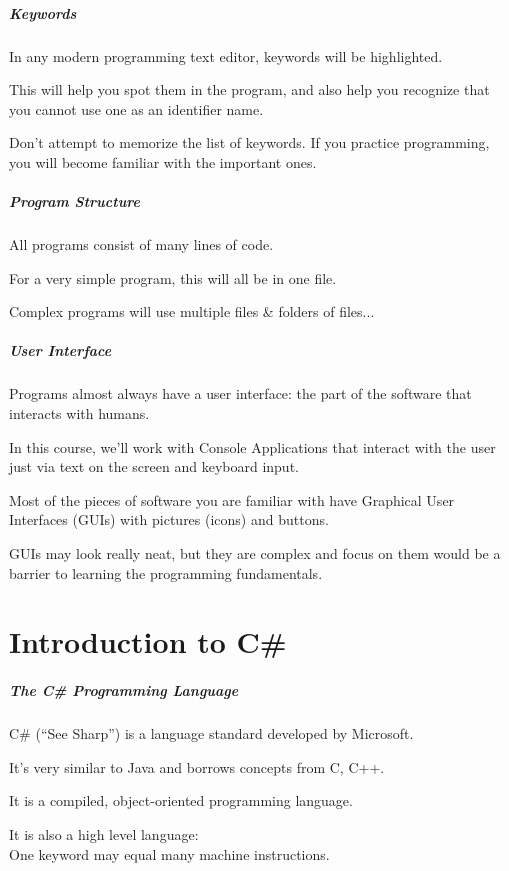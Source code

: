 \begin{frame}
\frametitle{Keywords}

In any modern programming text editor, keywords will be highlighted.

This will help you spot them in the program, and also help you recognize that you cannot use one as an identifier name.

Don't attempt to memorize the list of keywords. If you practice programming, you will become familiar with the important ones.

\end{frame}

\begin{frame}
\frametitle{Program Structure}

All programs consist of many lines of code.

For a very simple program, this will all be in one file.

Complex programs will use multiple files \& folders of files...

\end{frame}

\begin{frame}
\frametitle{User Interface}
Programs almost always have a user interface: the part of the software that interacts with humans.

In this course, we'll work with Console Applications that interact with the user just via text on the screen and keyboard input.

Most of the pieces of software you are familiar with have \alert{Graphical User Interfaces (GUIs)} with pictures (icons) and buttons.

GUIs may look really neat, but they are complex and focus on them would be a barrier to learning the programming fundamentals.

\end{frame}


\part{Introduction to C\#}
\begin{frame}\partpage\end{frame}

\begin{frame}
\frametitle{The C\# Programming Language}
\alert{C\#} (``See Sharp'') is a language standard developed by Microsoft.

It's very similar to Java and borrows concepts from C, C++.

It is a compiled, object-oriented programming language.

It is also a \alert{high level language}:\\
\quad\quad One keyword may equal many machine instructions.

\end{frame}



